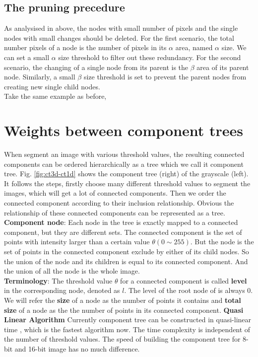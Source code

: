 \subsection{The pruning precedure}
As analysised in above, the nodes with small number of pixels and the single nodes with small changes should be deleted. For the first scenario, the total number pixels of a node is the number of pixels in its $\alpha$ area, named $\alpha$ size. We can set a small $\alpha$ size threshold to filter out these redundancy. For the second scenario, the changing of a single node from its parent is the $\beta$ area of its parent node. Similarly, a small $\beta$ size threshold is set to prevent the parent nodes from creating new single child nodes.\\
Take the same example as before, 
\section{Weights between component trees}
When segment an image with various threshold values, the resulting connected components can be ordered hierarchically as a tree which we call it component tree. Fig. \ref{fig:ct3d-ct1d} shows the component tree (right) of the grayscale (left). It follows the steps, firstly choose many different threshold values to segment the images, which will get a lot of connected components. Then we order the connected component according to their inclusion relationship. Obvious the relationship of these connected components can be represented as a tree.\\
\textbf{Component node}: Each node in the tree is exactly mapped to a connected component, but they are different sets. The connected component is the set of points with intensity larger than a certain value $\theta(0 \sim 255)$. But the node is the set of points in the connected component exclude by either of its child nodes. So the union of the node and its children is equal to its connected component. And the union of all the node is the whole image. \\
\textbf{Terminology}: The threshold value $\theta$ for a connected component is called \textbf{level} in the corresponding node, denoted as $l$. The level of the root node of is always 0. We will refer the \textbf{size} of a node as the number of points it contains and \textbf{total size} of a node as the the number of points in its connected component.
\textbf{Quasi Linear Algorithm}
Currently component tree can be constructed in quasi-linear time \cite{najman2006building}, which is the fastest algorithm now. The time complexity is independent of the number of threshold values. The speed of  building the component tree for 8-bit and 16-bit image has no much difference.\\
